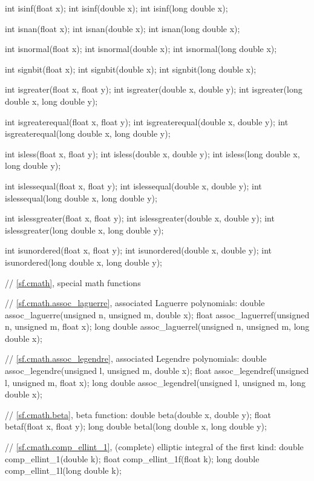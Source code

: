 \begin{codeblock}
{  int isinf(float x);
  int isinf(double x);
  int isinf(long double x);

  int isnan(float x);
  int isnan(double x);
  int isnan(long double x);

  int isnormal(float x);
  int isnormal(double x);
  int isnormal(long double x);

  int signbit(float x);
  int signbit(double x);
  int signbit(long double x);

  int isgreater(float x, float y);
  int isgreater(double x, double y);
  int isgreater(long double x, long double y);

  int isgreaterequal(float x, float y);
  int isgreaterequal(double x, double y);
  int isgreaterequal(long double x, long double y);

  int isless(float x, float y);
  int isless(double x, double y);
  int isless(long double x, long double y);

  int islessequal(float x, float y);
  int islessequal(double x, double y);
  int islessequal(long double x, long double y);

  int islessgreater(float x, float y);
  int islessgreater(double x, double y);
  int islessgreater(long double x, long double y);

  int isunordered(float x, float y);
  int isunordered(double x, double y);
  int isunordered(long double x, long double y);

  // \ref{sf.cmath}, special math functions

  // \ref{sf.cmath.assoc_laguerre}, associated Laguerre polynomials:
  double       assoc_laguerre(unsigned n, unsigned m, double x);
  float        assoc_laguerref(unsigned n, unsigned m, float x);
  long double  assoc_laguerrel(unsigned n, unsigned m, long double x);

  // \ref{sf.cmath.assoc_legendre}, associated Legendre polynomials:
  double       assoc_legendre(unsigned l, unsigned m, double x);
  float        assoc_legendref(unsigned l, unsigned m, float x);
  long double  assoc_legendrel(unsigned l, unsigned m, long double x);

  // \ref{sf.cmath.beta}, beta function:
  double       beta(double x, double y);
  float        betaf(float x, float y);
  long double  betal(long double x, long double y);

  // \ref{sf.cmath.comp_ellint_1}, (complete) elliptic integral of the first kind:
  double       comp_ellint_1(double k);
  float        comp_ellint_1f(float k);
  long double  comp_ellint_1l(long double k);

}
\end{codeblock}
